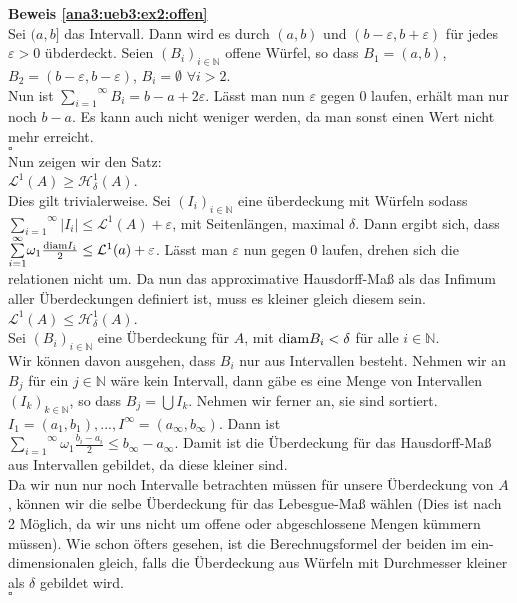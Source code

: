 \textbf{Beweis \ref{ana3:ueb3:ex2:offen}}\\

Sei $(a,b]$ das Intervall. Dann wird es durch $(a,b)$ und $(b - \varepsilon, b + \varepsilon)$ für jedes $\varepsilon > 0$ übderdeckt.
Seien $(B_i)_{i \in \mathbb{N}}$ offene Würfel, so dass $B_1 = (a,b)$, $B_2 = (b - \varepsilon, b - \varepsilon)$, $B_i = \emptyset$ $\forall i > 2$.\\
Nun ist $\overset{\infty}{\underset{i=1}{\sum}} B_i = b - a + 2 \varepsilon$. Lässt man nun $\varepsilon$ gegen 0 laufen, erhält man nur noch $b-a$.
Es kann auch nicht weniger werden, da man sonst einen Wert nicht mehr erreicht.\\
\mbox{} \hfill $\square$\\

Nun zeigen wir den Satz:\\
$\mathcal{L}^1(A) \geq \mathcal{H}^1_\delta (A)$.\\

Dies gilt trivialerweise. Sei $(I_i)_{i \in \mathbb{N}}$ eine überdeckung mit Würfeln sodass
$\overset{\infty}{\underset{i=1}{\sum}} |I_i| \leq \mathcal{L}^1 (A) + \varepsilon$, mit Seitenlängen, maximal $\delta$.
Dann ergibt sich, dass $\overset{\infty}{\underset{i=1}{\sum}} \omega_1 \frac{\text{diam} I_i}{2} \leq \mathcal{L}^1 (a) + \varepsilon$.
Lässt man $\varepsilon$ nun gegen $0$ laufen, drehen sich die relationen nicht um. Da nun das approximative Hausdorff-Maß als das Infimum
aller Überdeckungen definiert ist, muss es kleiner gleich diesem sein.\\

$\mathcal{L}^1 (A) \leq \mathcal{H}^1_\delta (A)$.\\

Sei $(B_i)_{i \in \mathbb{N}}$ eine Überdeckung für $A$, mit $\text{diam} B_i < \delta$ für alle $i \in \mathbb{N}$.\\
Wir können davon ausgehen, dass $B_i$ nur aus Intervallen besteht.
Nehmen wir an $B_j$ für ein $j \in \mathbb{N}$ wäre kein Intervall, dann gäbe es eine Menge von Intervallen
$(I_k)_{k \in \mathbb{N}}$, so dass $B_j = \bigcup I_k$. Nehmen wir ferner an, sie sind sortiert.
$I_1 = (a_1,b_1) , ... , I^\infty = (a_\infty, b_\infty)$. Dann ist\\
$\overset{\infty}{\underset{i=1}{\sum}} \omega_1 \frac{b_i - a_i}{2} \leq b_\infty - a_\infty$. Damit ist die Überdeckung für das
Hausdorff-Maß aus Intervallen gebildet, da diese kleiner sind.\\

Da wir nun nur noch Intervalle betrachten müssen für unsere Überdeckung von $A$, können wir die selbe
Überdeckung für das Lebesgue-Maß wählen (Dies ist nach 2 Möglich, da wir 
uns nicht um offene oder abgeschlossene Mengen kümmern müssen). Wie schon öfters gesehen, ist die Berechnugsformel der beiden im 
ein-dimensionalen gleich, falls die Überdeckung aus Würfeln mit Durchmesser kleiner als $\delta$ gebildet wird.\\

\mbox{} \hfill $\square$

